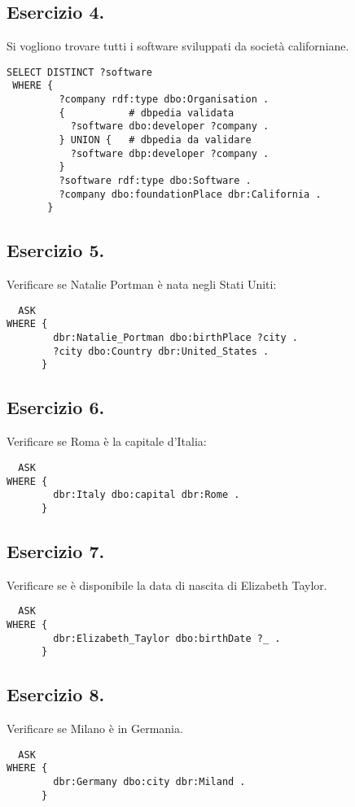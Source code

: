 \documentclass[11pt]{article}
\begin{document}
\subsection*{Esercizio 4.}
Si vogliono trovare tutti i software sviluppati da società californiane.
\begin{verbatim}
SELECT DISTINCT ?software
 WHERE {
         ?company rdf:type dbo:Organisation .
         {           # dbpedia validata
           ?software dbo:developer ?company .
         } UNION {   # dbpedia da validare
           ?software dbp:developer ?company .
         }
         ?software rdf:type dbo:Software .
         ?company dbo:foundationPlace dbr:California .
       }
\end{verbatim}

\subsection*{Esercizio 5.}
Verificare se Natalie Portman è nata negli Stati Uniti:
\begin{verbatim}
  ASK
WHERE {
        dbr:Natalie_Portman dbo:birthPlace ?city .
        ?city dbo:Country dbr:United_States .
      }
\end{verbatim}

\subsection*{Esercizio 6.}
Verificare se Roma è la capitale d'Italia:
\begin{verbatim}
  ASK 
WHERE {
        dbr:Italy dbo:capital dbr:Rome .
      }
\end{verbatim}

\subsection*{Esercizio 7.}
Verificare se è disponibile la data di nascita di Elizabeth Taylor.
\begin{verbatim}
  ASK
WHERE {
        dbr:Elizabeth_Taylor dbo:birthDate ?_ .
      }
\end{verbatim}

\subsection*{Esercizio 8.}
Verificare se Milano è in Germania.
\begin{verbatim}
  ASK
WHERE {
        dbr:Germany dbo:city dbr:Miland .
      }
\end{verbatim}
\end{document}
